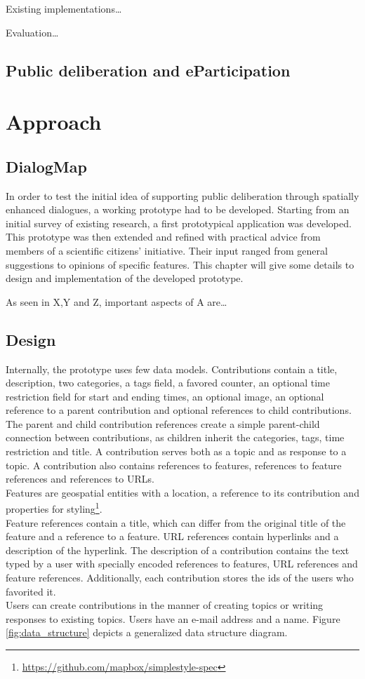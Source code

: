 \documentclass{sigchi}
\begin{document}
Existing implementations\dots

Evaluation\dots
\subsection{Public deliberation and eParticipation}


\section{Approach}



\subsection{DialogMap}

In order to test the initial idea of supporting public deliberation through spatially enhanced dialogues, a working prototype had to be developed. Starting from an initial survey of existing research, a first prototypical application was developed. This prototype was then extended and refined with practical advice from members of a scientific citizens' initiative. Their input ranged from general suggestions to opinions of specific features. This chapter will give some details to design and implementation of the developed prototype.

As seen in X,Y and Z, important aspects of A are\dots

\subsection{Design} %

Internally, the prototype uses few data models. Contributions contain a title, description, two categories, a tags field, a favored counter, an optional time restriction field for start and ending times, an optional image, an optional reference to a parent contribution and optional references to child contributions. The parent and child contribution references create a simple parent-child connection between contributions, as children inherit the categories, tags, time restriction and title. A contribution serves both as a topic and as response to a topic. A contribution also contains references to features, references to feature references and references to URLs.\\
Features are geospatial entities with a location, a reference to its contribution and properties for styling\footnote{\url{https://github.com/mapbox/simplestyle-spec}}.\\
Feature references contain a title, which can differ from the original title of the feature and a reference to a feature. URL references contain hyperlinks and a description of the hyperlink. The description of a contribution contains the text typed by a user with specially encoded references to features, URL references and feature references. Additionally, each contribution stores the ids of the users who favorited it.\\
Users can create contributions in the manner of creating topics or writing responses to existing topics. Users have an e-mail address and a name. Figure \ref{fig:data_structure} depicts a generalized data structure diagram.
\end{document}
